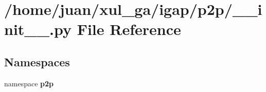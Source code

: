 \section{/home/juan/xul\_\-ga/igap/p2p/\_\-\_\-init\_\-\_\-.py File Reference}
\label{p2p_2____init_____8py}
\subsection*{Namespaces}
\begin{CompactItemize}
\item 
namespace {\bf p2p}
\end{CompactItemize}
